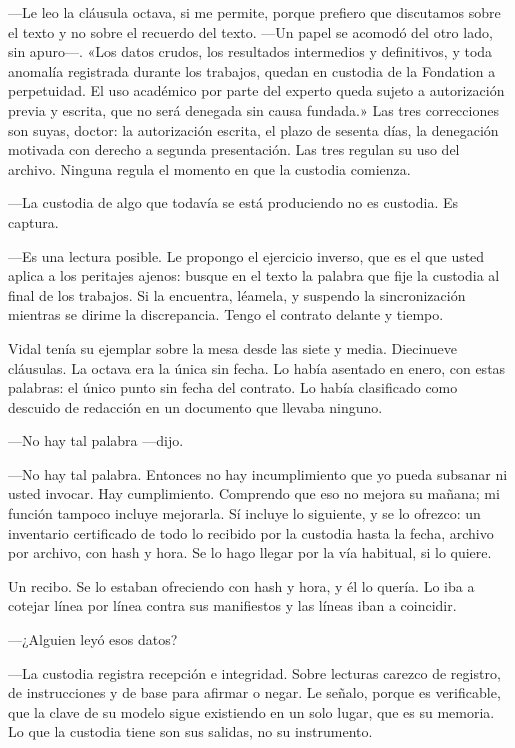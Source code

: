 ---Le leo la cláusula octava, si me permite, porque prefiero que discutamos sobre el texto y no sobre el recuerdo del texto. ---Un papel se acomodó del otro lado, sin apuro---. «Los datos crudos, los resultados intermedios y definitivos, y toda anomalía registrada durante los trabajos, quedan en custodia de la Fondation a perpetuidad. El uso académico por parte del experto queda sujeto a autorización previa y escrita, que no será denegada sin causa fundada.» Las tres correcciones son suyas, doctor: la autorización escrita, el plazo de sesenta días, la denegación motivada con derecho a segunda presentación. Las tres regulan su uso del archivo. Ninguna regula el momento en que la custodia comienza.

---La custodia de algo que todavía se está produciendo no es custodia. Es captura.

---Es una lectura posible. Le propongo el ejercicio inverso, que es el que usted aplica a los peritajes ajenos: busque en el texto la palabra que fije la custodia al final de los trabajos. Si la encuentra, léamela, y suspendo la sincronización mientras se dirime la discrepancia. Tengo el contrato delante y tiempo.

Vidal tenía su ejemplar sobre la mesa desde las siete y media. Diecinueve cláusulas. La octava era la única sin fecha. Lo había asentado en enero, con estas palabras: el único punto sin fecha del contrato. Lo había clasificado como descuido de redacción en un documento que llevaba ninguno.

---No hay tal palabra ---dijo.

---No hay tal palabra. Entonces no hay incumplimiento que yo pueda subsanar ni usted invocar. Hay cumplimiento. Comprendo que eso no mejora su mañana; mi función tampoco incluye mejorarla. Sí incluye lo siguiente, y se lo ofrezco: un inventario certificado de todo lo recibido por la custodia hasta la fecha, archivo por archivo, con hash y hora. Se lo hago llegar por la vía habitual, si lo quiere.

Un recibo. Se lo estaban ofreciendo con hash y hora, y él lo quería. Lo iba a cotejar línea por línea contra sus manifiestos y las líneas iban a coincidir.

---¿Alguien leyó esos datos?

---La custodia registra recepción e integridad. Sobre lecturas carezco de registro, de instrucciones y de base para afirmar o negar. Le señalo, porque es verificable, que la clave de su modelo sigue existiendo en un solo lugar, que es su memoria. Lo que la custodia tiene son sus salidas, no su instrumento.

